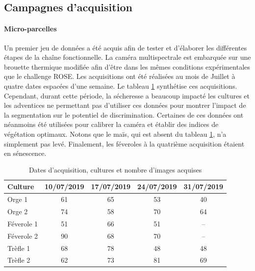 \documentclass[../thesis.tex]{subfiles}
\begin{document}
    \subsection{Campagnes d'acquisition}
    
    \paragraph{Micro-parcelles}
    
    Un premier jeu de données a été acquis afin de tester et d'élaborer les différentes étapes de la chaîne fonctionnelle. La caméra multispectrale est embarquée sur une brouette thermique modifiée afin d'être dans les mêmes conditions expérimentales que le challenge ROSE. Les acquisitions ont été réalisées au mois de Juillet à quatre dates espacées d'une semaine. Le tableau \ref{tab:04-acquisition-source} synthétise ces acquisitions. Cependant, durant cette période, la sécheresse a beaucoup impacté les cultures et les adventices ne permettant pas d'utiliser ces données pour montrer l'impact de la segmentation sur le potentiel de discrimination. Certaines de ces données ont néanmoins été utilisées pour calibrer la caméra et établir des indices de végétation optimaux. Notons que le maïs, qui est absent du tableau \ref{tab:04-acquisition-source}, n'a simplement pas levé. Finalement, les féveroles à la quatrième acquisition étaient en sénescence.
    
    \begin{table}[H]
        \centering
        \begin{tabular}{l c c c c}
            \hline \textbf{Culture} & \textbf{10/07/2019} & \textbf{17/07/2019} & \textbf{24/07/2019} & \textbf{31/07/2019} \\ \hline
            Orge 1 		& 61 & 65 & 53 & 40 \\
            Orge 2 		& 74 & 58 & 70 & 64 \\ \hline
            Féverole 1  & 51 & 66 & 51 & -- \\
            Féverole 2  & 90 & 68 & 70 & -- \\ \hline
            Trèfle 1    & 68 & 78 & 48 & 48 \\ 
            Trèfle 2    & 62 & 73 & 81 & 69 \\ \hline
        \end{tabular}
        \caption{Dates d'acquisition, cultures et nombre d'images acquises}
        \label{tab:04-acquisition-source}
    \end{table}
    
\end{document}
